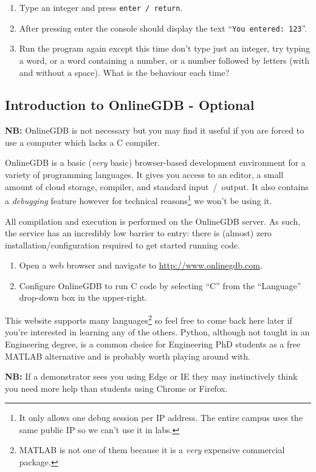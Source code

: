 \documentclass{lab}
\begin{document}
\begin{task}{}{}
\begin{enumerate}
\item Type an integer and press \texttt{enter / return}.

\item After pressing enter the console should display the text ``\texttt{You entered: 123}''.

\item Run the program again except this time don't type just an integer, try typing a word, or a word containing a number, or a number followed by letters (with and without a space). What is the behaviour each time?

\end{enumerate}
\end{task}\label{tsk:stdio}


\pagebreak
\subsection{Introduction to OnlineGDB - Optional}

\textbf{NB:} OnlineGDB is not necessary but you may find it useful if you are forced to use a computer which lacks a C compiler.

OnlineGDB is a basic (\textit{very} basic) browser-based development environment for a variety of programming languages. It gives you access to an editor, a small amount of cloud storage, compiler, and standard input~/~output. It also contains a \textit{debugging} feature however for technical reasons\footnote{It only allows one debug session per IP address. The entire campus uses the same public IP so we can't use it in labs.} we won't be using it.

All compilation and execution is performed on the OnlineGDB server. As such, the service has an incredibly low barrier to entry: there is (almost) zero installation/configuration required to get started running code.

\begin{task}{}{}
\begin{enumerate}

\item Open a web browser and navigate to \url{http://www.onlinegdb.com}.

\item Configure OnlineGDB to run C code by selecting ``C'' from the ``Language'' drop-down box in the upper-right.
\end{enumerate}

This website supports many languages\footnote{MATLAB is not one of them because it is a \textit{very} expensive commercial package.} so feel free to come back here later if you're interested in learning any of the others. Python, although not taught in an Engineering degree, is a common choice for Engineering PhD students as a free MATLAB alternative and is probably worth playing around with.

\textbf{NB:} If a demonstrator sees you using Edge or IE they may instinctively think you need more help than students using Chrome or Firefox.
\end{task}
\end{document}
